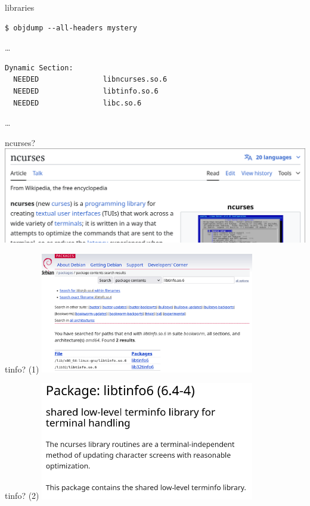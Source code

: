 \begin{frame}[fragile]{libraries}
\begin{Verbatim}[fontsize=\small]
$ objdump --all-headers mystery
\end{Verbatim}
\ldots
\begin{Verbatim}[fontsize=\small]
Dynamic Section:
  NEEDED               libncurses.so.6
  NEEDED               libtinfo.so.6
  NEEDED               libc.so.6
\end{Verbatim}
\ldots
\end{frame}

\begin{frame}[fragile]{ncurses?}
\includegraphics[width=\textwidth]{../re-tools/ncurses-wiki}
\end{frame}

\begin{frame}[fragile]{tinfo? (1)}
\includegraphics[width=0.7\textwidth]{../re-tools/deb-tinfo1}
\end{frame}

\begin{frame}[fragile]{tinfo? (2)}
\includegraphics[width=0.7\textwidth]{../re-tools/deb-tinfo2}
\end{frame}

